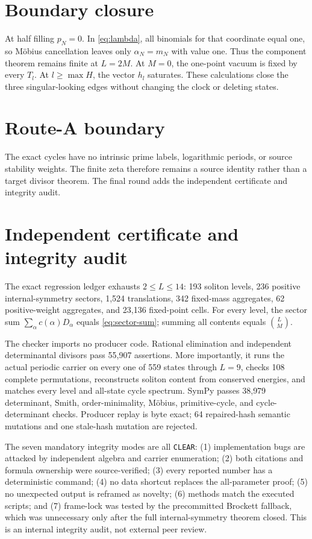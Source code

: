 \documentclass[10pt]{article}
\newif\ifroundone
\begin{document}
\section{Boundary closure}
At half filling $p_N=0$.  In \eqref{eq:lambda}, all binomials for that
coordinate equal one, so M\"obius cancellation leaves only $\alpha_N=m_N$
with value one.  Thus the component theorem remains finite at $L=2M$.
At $M=0$, the one-point vacuum is fixed by every $T_l$.  At
$l\ge\max H$, the vector $h_l$ saturates.  These calculations close the
three singular-looking edges without changing the clock or deleting states.

\ifroundone
\section{Route-A boundary}
The exact cycles have no intrinsic prime labels, logarithmic periods, or
source stability weights.  The finite zeta therefore remains a source
identity rather than a target divisor theorem.  The final round adds the
independent certificate and integrity audit.
\else
\section{Independent certificate and integrity audit}
The exact regression ledger exhausts $2\le L\le14$: 193 soliton levels,
236 positive internal-symmetry sectors, 1{,}524 translations, 342 fixed-mass
aggregates, 62 positive-weight aggregates, and 23{,}136 fixed-point cells.
For every level, the sector sum $\sum_\alpha c(\alpha)D_\alpha$ equals
\eqref{eq:sector-sum}; summing all contents equals $\binom LM$.

The checker imports no producer code.  Rational elimination and independent
determinantal divisors pass 55{,}907 assertions.  More importantly, it runs
the actual periodic carrier on every one of 559 states through $L=9$, checks
108 complete permutations, reconstructs soliton content from conserved
energies, and matches every level and all-state cycle spectrum.  SymPy passes
38{,}979 determinant, Smith, order-minimality, M\"obius, primitive-cycle, and
cycle-determinant checks.  Producer replay is byte exact; 64 repaired-hash
semantic mutations and one stale-hash mutation are rejected.

The seven mandatory integrity modes are all \texttt{CLEAR}: (1) implementation
bugs are attacked by independent algebra and carrier enumeration; (2) both
citations and formula ownership were source-verified; (3) every reported
number has a deterministic command; (4) no data shortcut replaces the
all-parameter proof; (5) no unexpected output is reframed as novelty;
(6) methods match the executed scripts; and (7) frame-lock was tested by the
precommitted Brockett fallback, which was unnecessary only after the full
internal-symmetry theorem closed.  This is an internal integrity audit, not
external peer review.
\end{document}
